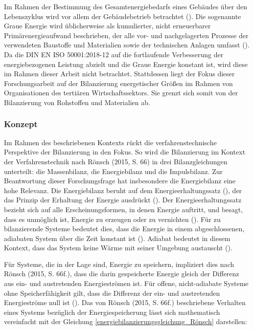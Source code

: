 Im Rahmen der Bestimmung des Gesamtenergiebedarfs eines Gebäudes über den Lebenszyklus wird vor allem der Gebäudebetrieb betrachtet (\cite[S. 133]{Musall.2015}).
Die sogenannte Graue Energie wird üblicherweise als kumulierter, nicht erneuerbarer Primärenergieaufwand beschrieben, der alle vor- und nachgelagerten Prozesse 
der verwendeten Baustoffe und Materialien sowie der technischen Anlagen umfasst (\cite[S. 133]{Musall.2015}). Da die DIN EN ISO 50001:2018-12 auf die fortlaufende 
Verbesserung der energiebezogenen Leistung abzielt und die Graue Energie konstant ist, wird diese im Rahmen dieser Arbeit nicht betrachtet.
Stattdessen liegt der Fokus dieser Forschungsarbeit auf der Bilanzierung energetischer Größen im Rahmen von Organisationen des tertiären Wirtschaftssektors. 
Sie grenzt sich somit von der Bilanzierung von Rohstoffen und Materialien ab.


\subsubsection{Konzept}
Im Rahmen des beschriebenen Kontexts rückt die verfahrenstechnische Perspektive der Bilanzierung in den Fokus. 
So wird die Bilanzierung im Kontext der Verfahrenstechnik nach Rönsch (2015, S. 66) in drei Bilanzgleichungen unterteilt: die Massenbilanz, 
die Energiebilanz und die Impulsbilanz.
Zur Beantwortung dieser Forschungsfrage hat insbesondere die Energiebilanz eine hohe Relevanz.
Die Energiebilanz beruht auf dem Energieerhaltungssatz (\cite[S. 66]{Rönsch.2015}), der das Prinzip der Erhaltung der Energie ausdrückt 
(\cite[S. 57]{Baehr.1966}). Der Energieerhaltungssatz bezieht sich auf alle Erscheinungsformen, in denen Energie auftritt, und besagt, dass es 
unmöglich ist, Energie zu erzeugen oder zu vernichten (\cite[S. 57]{Baehr.1966}).
Für zu bilanzierende Systeme bedeutet dies, dass die Energie in einem abgeschlossenen, adiabaten System über die Zeit konstant ist 
(\cite[S. 66]{Rönsch.2015}). Adiabat bedeutet in diesem Kontext, dass das System keine Wärme mit seiner Umgebung austauscht (\cite[S. 66]{Rönsch.2015}).

Für Systeme, die in der Lage sind, Energie zu speichern, impliziert dies nach Rönsch (2015, S. 66f.), dass die darin gespeicherte Energie gleich der 
Differenz aus ein- und austretenden Energieströmen ist.
Für offene, nicht-adiabate Systeme ohne Speicherfähigkeit gilt, dass die Differenz der ein- und austretenden Energieströme null ist (\cite[S. 66f.]{Rönsch.2015}).
Das von Rönsch (2015, S. 66f.) beschriebene Verhalten eines Systems bezüglich der Energiespeicherung lässt sich mathematisch vereinfacht mit der Gleichung 
\eqref{energiebilanzierungsgleichung_Rönsch} darstellen:

